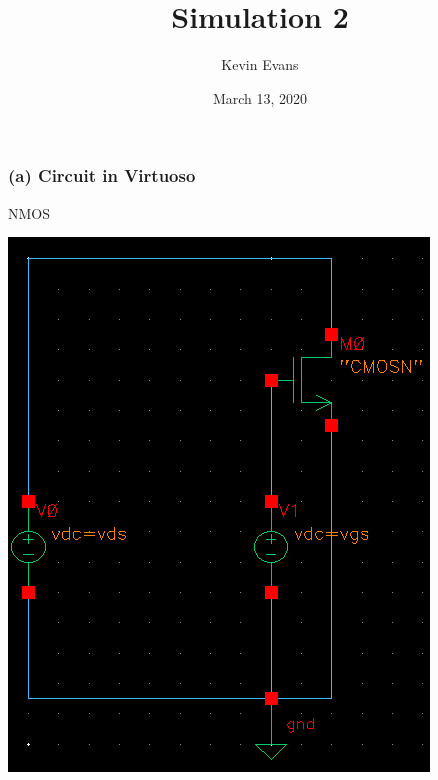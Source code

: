 \documentclass{homework}
\title{Simulation 2}
\author{Kevin Evans}
\date{March 13, 2020}
\begin{document}
	\maketitle
	
	\subsubsection*{(a) Circuit in Virtuoso}
	\begin{minipage}[t]{0.5\linewidth}
		\centering NMOS
		
		\noindent\includegraphics[width=1\linewidth]{hw2}
	\end{minipage}
\end{document}
